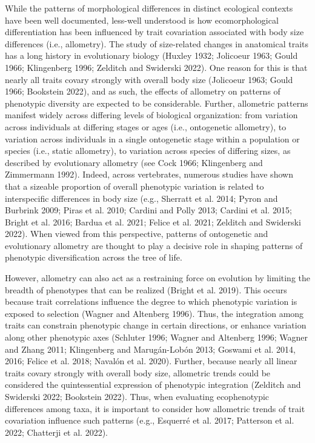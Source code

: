\documentclass[
  11pt,
]{article}
\begin{document}
While the patterns of morphological differences in distinct ecological
contexts have been well documented, less-well understood is how
ecomorphological differentiation has been influenced by trait
covariation associated with body size differences (i.e., allometry). The
study of size-related changes in anatomical traits has a long history in
evolutionary biology (Huxley 1932; Jolicoeur 1963; Gould 1966;
Klingenberg 1996; Zelditch and Swiderski 2022). One reason for this is
that nearly all traits covary strongly with overall body size (Jolicoeur
1963; Gould 1966; Bookstein 2022), and as such, the effects of allometry
on patterns of phenotypic diversity are expected to be considerable.
Further, allometric patterns manifest widely across differing levels of
biological organization: from variation across individuals at differing
stages or ages (i.e., ontogenetic allometry), to variation across
individuals in a single ontogenetic stage within a population or species
(i.e., static allometry), to variation across species of differing
sizes, as described by evolutionary allometry (see Cock 1966;
Klingenberg and Zimmermann 1992). Indeed, across vertebrates, numerous
studies have shown that a sizeable proportion of overall phenotypic
variation is related to interspecific differences in body size (e.g.,
Sherratt et al. 2014; Pyron and Burbrink 2009; Piras et al. 2010;
Cardini and Polly 2013; Cardini et al. 2015; Bright et al. 2016; Bardua
et al. 2021; Felice et al. 2021; Zelditch and Swiderski 2022). When
viewed from this perspective, patterns of ontogenetic and evolutionary
allometry are thought to play a decisive role in shaping patterns of
phenotypic diversification across the tree of life. \hfill\break

However, allometry can also act as a restraining force on evolution by
limiting the breadth of phenotypes that can be realized (Bright et al.
2019). This occurs because trait correlations influence the degree to
which phenotypic variation is exposed to selection (Wagner and Altenberg
1996). Thus, the integration among traits can constrain phenotypic
change in certain directions, or enhance variation along other
phenotypic axes (Schluter 1996; Wagner and Altenberg 1996; Wagner and
Zhang 2011; Klingenberg and Marugán-Lobón 2013; Goswami et al. 2014,
2016; Felice et al. 2018; Navalón et al. 2020). Further, because nearly
all linear traits covary strongly with overall body size, allometric
trends could be considered the quintessential expression of phenotypic
integration (Zelditch and Swiderski 2022; Bookstein 2022). Thus, when
evaluating ecophenotypic differences among taxa, it is important to
consider how allometric trends of trait covariation influence such
patterns (e.g., Esquerré et al. 2017; Patterson et al. 2022; Chatterji
et al. 2022). \hfill\break
\end{document}
